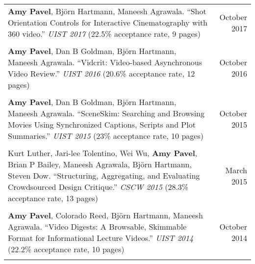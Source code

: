 \begin{longtable}{Xr}
	\textbf{Amy Pavel}, Björn Hartmann, Maneesh Agrawala. ``Shot Orientation Controls for Interactive Cinematography with 360 video.'' \textit{UIST 2017} (22.5\% acceptance rate, 9 pages) & October 2017 \\
	\\

	\textbf{Amy Pavel}, Dan B Goldman, Björn Hartmann, Maneesh Agrawala. ``Vidcrit: Video-based Asynchronous Video Review.'' \textit{UIST 2016} (20.6\% acceptance rate, 12 pages) & October 2016 \\
	\\

	\textbf{Amy Pavel}, Dan B Goldman, Björn Hartmann, Maneesh Agrawala. ``SceneSkim: Searching and Browsing Movies Using Synchronized Captions, Scripts and Plot Summaries.'' \textit{UIST 2015} (23\% acceptance rate, 10 pages) & October 2015 \\
	\\

	Kurt Luther, Jari-lee Tolentino, Wei Wu, \textbf{Amy Pavel}, Brian P Bailey, Maneesh Agrawala, Björn Hartmann, Steven Dow. ``Structuring, Aggregating, and Evaluating Crowdsourced Design Critique.'' \textit{CSCW 2015} (28.3\% acceptance rate, 13 pages) & March 2015 \\
	\\

	\textbf{Amy Pavel}, Colorado Reed, Björn Hartmann, Maneesh Agrawala. ``Video Digests: A Browsable, Skimmable Format for Informational Lecture Videos.'' \textit{UIST 2014} (22.2\% acceptance rate, 10 pages) & October 2014 \\
	\\

\end{longtable}